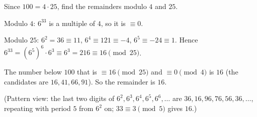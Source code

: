 Since $100=4\cdot25$, find the remainders modulo $4$ and $25$.

Modulo $4$: $6^{33}$ is a multiple of $4$, so it is $\equiv0$.

Modulo $25$: $6^2=36\equiv11$, $6^4\equiv121\equiv-4$, $6^5\equiv-24\equiv1$. Hence $6^{33}=\left(6^5\right)^6\cdot6^3\equiv6^3=216\equiv16\pmod{25}$.

The number below $100$ that is $\equiv16\pmod{25}$ and $\equiv0\pmod4$ is $16$ (the candidates are $16,41,66,91$). So the remainder is $\boxed{16}$.

(Pattern view: the last two digits of $6^2,6^3,6^4,6^5,6^6,\dots$ are $36,16,96,76,56,36,\dots$, repeating with period $5$ from $6^2$ on; $33\equiv3\pmod5$ gives $16$.)
